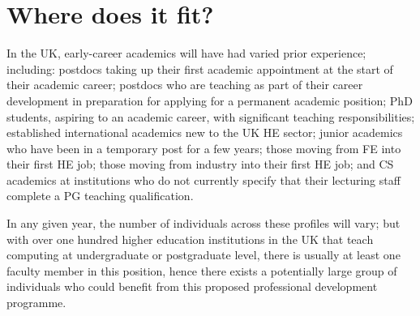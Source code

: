 \documentclass[sigconf]{acmart}
\begin{document}


\section{Where does it fit?}
In the UK, early-career academics will have had varied prior
experience; including: postdocs taking up their first academic
appointment at the start of their academic career; postdocs who are
teaching as part of their career development in preparation for
applying for a permanent academic position; PhD students, aspiring to
an academic career, with significant teaching responsibilities;
established international academics new to the UK HE sector; junior
academics who have been in a temporary post for a few years; those
moving from FE into their first HE job; those moving from industry
into their first HE job; and CS academics at institutions who do not
currently specify that their lecturing staff complete a PG teaching
qualification.

In any given year, the number of individuals across these profiles
will vary; but with over one hundred higher education institutions in
the UK that teach computing at undergraduate or postgraduate level,
there is usually at least one faculty member in this position, hence
there exists a potentially large group of individuals who could
benefit from this proposed professional development programme.

\end{document}
